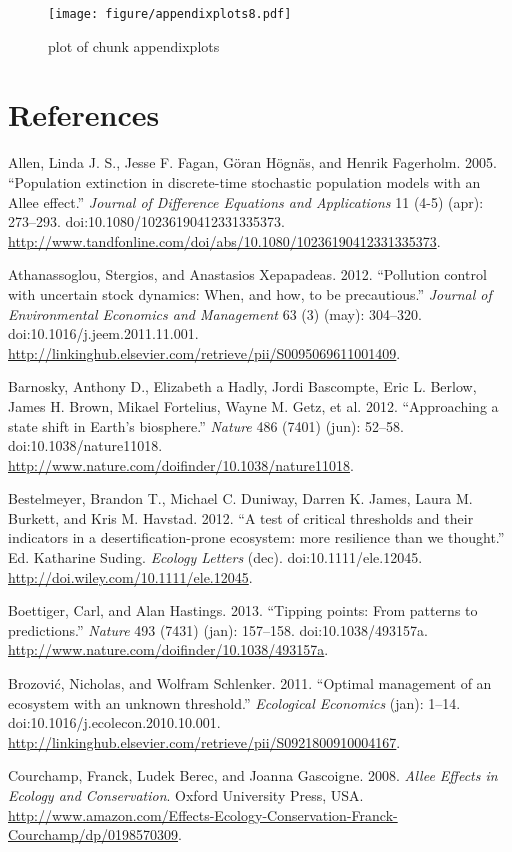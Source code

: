 \documentclass[author-year, review]{elsarticle} %
\makeatletter
\def\maxwidth{\ifdim\Gin@nat@width>\linewidth\linewidth
\else\Gin@nat@width\fi}
\let\Oldincludegraphics\includegraphics
\renewcommand{\includegraphics}[1]{\Oldincludegraphics[width=\maxwidth]{#1}}
\makeatother
\begin{document}
\begin{figure}[htbp]
\centering
\texttt{[image: figure/appendixplots8.pdf]}
\caption{plot of chunk appendixplots}
\end{figure}

\section{References}

Allen, Linda J. S., Jesse F. Fagan, Göran Högnäs, and Henrik Fagerholm.
2005. ``Population extinction in discrete-time stochastic population
models with an Allee effect.'' \emph{Journal of Difference Equations and
Applications} 11 (4-5) (apr): 273--293.
doi:10.1080/10236190412331335373.
\url{http://www.tandfonline.com/doi/abs/10.1080/10236190412331335373}.

Athanassoglou, Stergios, and Anastasios Xepapadeas. 2012. ``Pollution
control with uncertain stock dynamics: When, and how, to be
precautious.'' \emph{Journal of Environmental Economics and Management}
63 (3) (may): 304--320. doi:10.1016/j.jeem.2011.11.001.
\url{http://linkinghub.elsevier.com/retrieve/pii/S0095069611001409}.

Barnosky, Anthony D., Elizabeth a Hadly, Jordi Bascompte, Eric L.
Berlow, James H. Brown, Mikael Fortelius, Wayne M. Getz, et al. 2012.
``Approaching a state shift in Earth's biosphere.'' \emph{Nature} 486
(7401) (jun): 52--58. doi:10.1038/nature11018.
\url{http://www.nature.com/doifinder/10.1038/nature11018}.

Bestelmeyer, Brandon T., Michael C. Duniway, Darren K. James, Laura M.
Burkett, and Kris M. Havstad. 2012. ``A test of critical thresholds and
their indicators in a desertification-prone ecosystem: more resilience
than we thought.'' Ed. Katharine Suding. \emph{Ecology Letters} (dec).
doi:10.1111/ele.12045. \url{http://doi.wiley.com/10.1111/ele.12045}.

Boettiger, Carl, and Alan Hastings. 2013. ``Tipping points: From
patterns to predictions.'' \emph{Nature} 493 (7431) (jan): 157--158.
doi:10.1038/493157a.
\url{http://www.nature.com/doifinder/10.1038/493157a}.

Brozović, Nicholas, and Wolfram Schlenker. 2011. ``Optimal management of
an ecosystem with an unknown threshold.'' \emph{Ecological Economics}
(jan): 1--14. doi:10.1016/j.ecolecon.2010.10.001.
\url{http://linkinghub.elsevier.com/retrieve/pii/S0921800910004167}.

Courchamp, Franck, Ludek Berec, and Joanna Gascoigne. 2008. \emph{Allee
Effects in Ecology and Conservation}. Oxford University Press, USA.
\url{http://www.amazon.com/Effects-Ecology-Conservation-Franck-Courchamp/dp/0198570309}.
\end{document}
